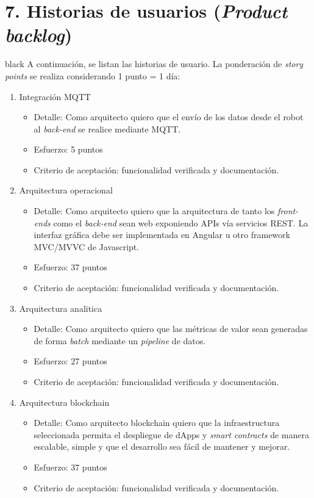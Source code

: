 \documentclass[
11pt, %
]{charter}
\begin{document}
\section{7. Historias de usuarios (\textit{Product backlog})}
\label{sec:backlog}

\begin{consigna}{black}
A continuación, se listan las historias de usuario. La ponderación de \textit{story points} se realiza considerando 1 punto = 1 día:


\begin{enumerate}


	\item Integración MQTT
	\begin{itemize}
		\item Detalle: Como arquitecto quiero que el envío de los datos desde el robot al \textit{back-end} se realice mediante MQTT.
		\item Esfuerzo: 5 puntos
		\item Criterio de aceptación: funcionalidad verificada y documentación.
	\end{itemize}


	\item Arquitectura operacional
	\begin{itemize}
		\item Detalle: Como arquitecto quiero que la arquitectura de tanto los \textit{front-ends} como el \textit{back-end} sean web exponiendo APIs vía servicios REST. La interfaz gráfica debe ser implementada en Angular u otro framework MVC/MVVC de Javascript.
		\item Esfuerzo: 37 puntos
		\item Criterio de aceptación: funcionalidad verificada y documentación.
	\end{itemize}

	\item Arquitectura analitica
	\begin{itemize}
		\item Detalle: Como arquitecto quiero que las métricas de valor sean generadas de forma \textit{batch} mediante un \textit{pipeline} de datos.
		\item Esfuerzo: 27 puntos
		\item Criterio de aceptación: funcionalidad verificada y documentación.
	\end{itemize}

	\item Arquitectura blockchain
	\begin{itemize}
		\item Detalle: Como arquitecto blockchain quiero que la infraestructura seleccionada permita el despliegue de dApps y \textit{smart contracts} de manera escalable, simple y que el desarrollo sea fácil de mantener y mejorar.
		\item Esfuerzo: 37 puntos
		\item Criterio de aceptación: funcionalidad verificada y documentación.
	\end{itemize}


\end{enumerate}
\end{consigna}
\end{document}

